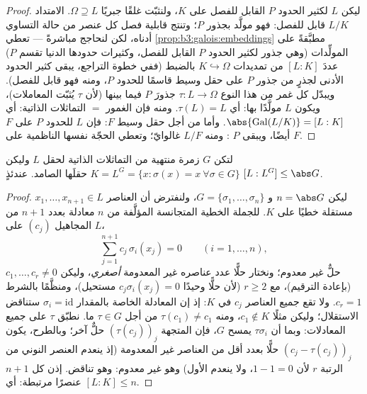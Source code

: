 \begin{proof}
ليكن $L$  لكثير الحدود $P$ القابل للفصل على $K$،
ولنثبّت غلقًا جبريًا $\Omega \supseteq L$. الامتداد $L/K$ قابل للفصل: فهو
مولَّد بجذور $P$؛ وتنتج قابلية فصل كل عنصر من حالة التساوي
أدناه، لكن لنحاجج مباشرةً --- تعطي \cref{prop:b3:galois:embeddings} مطبَّقةً على
المولِّدات (وهي جذور لكثير الحدود $P$ القابل للفصل، وكثيرات
حدودها الدنيا تقسم $P$) عددَ $[L:K]$ من تمديدات $K \hookrightarrow \Omega$ بالضبط
(ففي خطوة التراجع، يبقى كثير الحدود الأدنى لجذرٍ من جذور $P$ على
حقل وسيط قاسمًا للحدود $P$، ومنه فهو قابل للفصل). ويبدّل كل غمر من
هذا النوع $\tau \colon L \to \Omega$ جذورَ $P$ فيما بينها (لأن $\tau$ يُثبّت
المعاملات)، ويكون $L$ مولَّدًا بها: أي $\tau(L) = L$. ومنه فإن
الغمور $=$ التماثلات الذاتية: أي $\abs{\operatorname{Gal}(L/K)} = [L:K]$. وأما من أجل حقل وسيط
$F$: فإن $L$  للحدود $P$ على $F$ أيضًا، ويبقى $P$ : ومنه $L/F$ غالوايّ؛ وتعطي الحجّة نفسها الناظمية على $F$.
\end{proof}

\begin{lemma}[أرتين]\label{lem:b3:galois:artin}
لتكن $G$ زمرة منتهية من التماثلات الذاتية لحقل $L$ وليكن $K = L^G = \{x : \sigma(x) = x\ \forall\sigma \in G\}$
حقلَها الصامد. عندئذٍ $[L : L^G] \leq \abs G$.
\end{lemma}

\begin{proof}
ليكن $n = \abs G$ و $G = \{\sigma_1, \dots, \sigma_n\}$، ولنفترض أن العناصر $x_1, \dots, x_{n+1} \in L$ مستقلة
خطيًا على $K$. للجملة الخطية المتجانسة المؤلَّفة من $n$ معادلة
بعدد $n+1$ من المجاهيل $(c_j)$ على $L$،
\[
\sum_{j=1}^{n+1} c_j\,\sigma_i(x_j) = 0
\qquad (i = 1, \dots, n),
\]
حلٌّ غير معدوم؛ ونختار حلًّا عدد عناصره غير المعدومة
\emph{أصغري}، وليكن $c_1, \dots, c_r \neq 0$ (بإعادة الترقيم)، مع $r \geq 2$
(لأن حلًّا وحيدًا $c_j\sigma_i(x_j) = 0$ مستحيل)، ومنظَّمًا بالشرط $c_r = 1$. ولا
تقع جميع العناصر $c_j$ في $K$: إذ إن المعادلة الخاصة بالمقدار $\sigma_i =
\mathrm{id}$
ستناقض الاستقلال؛ وليكن مثلًا $c_1 \notin K$، ومنه $\tau(c_1) \ne c_1$ من
أجل $\tau \in G$ ما. نطبّق $\tau$ على جميع المعادلات: وبما أن
$\tau\sigma_i$ يمسح $G$، فإن المتجهة $(\tau(c_j))_j$ حلٌّ آخر؛
وبالطرح، يكون $(c_j -
\tau(c_j))_j$ حلًّا بعدد أقل من العناصر غير المعدومة
(إذ ينعدم العنصر النوني من الرتبة $r$ لأن $1 - 1 = 0$، ولا
ينعدم الأول) وهو غير معدوم: وهو تناقض. إذن كل $n+1$ عنصرًا
مرتبطة: أي $[L:K]
\leq n$.
\end{proof}

